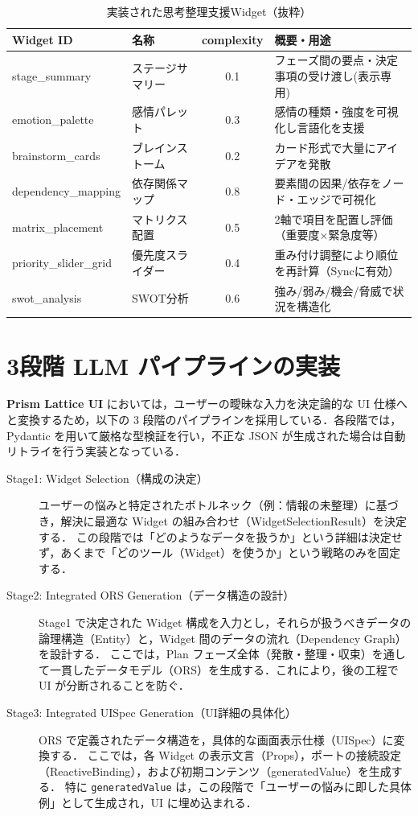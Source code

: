 \documentclass[senior,final,11pt,dvipdfmx]{iputit-thesis}
\begin{document}
\begin{table}[!t]
\caption{実装された思考整理支援Widget（抜粋）}
\label{tab:widget_list}
\centering
\small
\begin{tabular}{llcp{5cm}} \toprule
Widget ID & 名称 & complexity & 概要・用途 \\ \midrule
stage\_summary & ステージサマリー & 0.1 & フェーズ間の要点・決定事項の受け渡し(表示専用) \\
emotion\_palette & 感情パレット & 0.3 & 感情の種類・強度を可視化し言語化を支援 \\
brainstorm\_cards & ブレインストーム & 0.2 & カード形式で大量にアイデアを発散 \\
dependency\_mapping & 依存関係マップ & 0.8 & 要素間の因果/依存をノード・エッジで可視化 \\
matrix\_placement & マトリクス配置 & 0.5 & 2軸で項目を配置し評価（重要度×緊急度等） \\
priority\_slider\_grid & 優先度スライダー & 0.4 & 重み付け調整により順位を再計算（Syncに有効） \\
swot\_analysis & SWOT分析 & 0.6 & 強み/弱み/機会/脅威で状況を構造化 \\ \bottomrule
\end{tabular}
\end{table}


\section{3段階 LLM パイプラインの実装}

\textbf{Prism Lattice UI} においては，ユーザーの曖昧な入力を決定論的な UI 仕様へと変換するため，以下の 3 段階のパイプラインを採用している．各段階では，Pydantic を用いて厳格な型検証を行い，不正な JSON が生成された場合は自動リトライを行う実装となっている．

\begin{description}
  \item[Stage1: Widget Selection（構成の決定）]
    ユーザーの悩みと特定されたボトルネック（例：情報の未整理）に基づき，解決に最適な Widget の組み合わせ（WidgetSelectionResult）を決定する．
    この段階では「どのようなデータを扱うか」という詳細は決定せず，あくまで「どのツール（Widget）を使うか」という戦略のみを固定する．
  \item[Stage2: Integrated ORS Generation（データ構造の設計）]
    Stage1 で決定された Widget 構成を入力とし，それらが扱うべきデータの論理構造（Entity）と，Widget 間のデータの流れ（Dependency Graph）を設計する．
    ここでは，Plan フェーズ全体（発散・整理・収束）を通して一貫したデータモデル（ORS）を生成する．これにより，後の工程で UI が分断されることを防ぐ．
  \item[Stage3: Integrated UISpec Generation（UI詳細の具体化）]
    ORS で定義されたデータ構造を，具体的な画面表示仕様（UISpec）に変換する．
    ここでは，各 Widget の表示文言（Props），ポートの接続設定（ReactiveBinding），および初期コンテンツ（generatedValue）を生成する．
    特に \texttt{generatedValue} は，この段階で「ユーザーの悩みに即した具体例」として生成され，UI に埋め込まれる．
\end{description}
\end{document}
